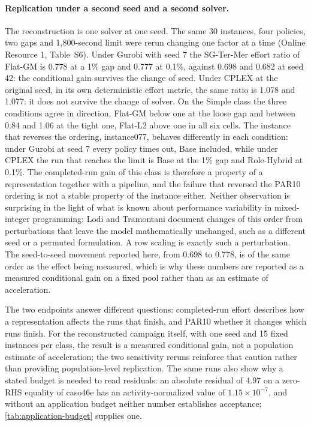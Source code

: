 \documentclass[smallextended,envcountsect,envcountsame]{svjour3}
\begin{document}
\paragraph{Replication under a second seed and a second solver.} The reconstruction is one
solver at one seed. The same 30 instances, four policies, two gaps and 1,800-second limit were
rerun changing one factor at a time (Online Resource 1, Table~S6). Under Gurobi with seed 7 the
SG-Ter-Mer effort ratio of Flat-GM is 0.778 at a 1\% gap and 0.777 at 0.1\%, against 0.698 and
0.682 at seed 42: the conditional gain survives the change of seed. Under CPLEX at the original
seed, in its own deterministic effort metric, the same ratio is 1.078 and 1.077: it does not survive
the change of solver. On the Simple class the three conditions agree in direction, Flat-GM below
one at the loose gap and between 0.84 and 1.06 at the tight one, Flat-L2 above one in all six
cells. The instance that reverses the ordering, instance077, behaves differently in each
condition: under Gurobi at seed 7 every policy times
out, Base included, while under CPLEX the run that reaches the limit is Base at the 1\% gap and
Role-Hybrid at 0.1\%.
The completed-run gain of this class is therefore a property of a representation together with a
pipeline, and the failure that reversed the PAR10 ordering is not a stable property of the
instance either. Neither observation is surprising in the light of what is known about
performance variability in mixed-integer programming: Lodi and Tramontani
\cite{lodi2013variability} document changes of this order from perturbations that leave the
model mathematically unchanged, such as a different seed or a permuted formulation. A row
scaling is exactly such a perturbation. The seed-to-seed movement reported here, from 0.698 to
0.778, is of the same order as the effect being measured, which is why these numbers are
reported as a measured conditional gain on a fixed pool rather than as an estimate of
acceleration.

The two endpoints answer different questions: completed-run effort describes how a
representation affects the runs that finish, and PAR10 whether it changes which runs finish.
For the reconstructed campaign itself, with one seed and 15 fixed instances per class, the
result is a measured conditional gain, not a population estimate of acceleration; the two
sensitivity reruns reinforce that caution rather than providing population-level replication. The same runs also show why a stated budget is
needed to read residuals: an absolute residual of 4.97 on a zero-RHS equality of caso46e has an
activity-normalized value of $1.15\times10^{-7}$, and without an application budget neither
number establishes acceptance; \cref{tab:application-budget} supplies one.
\end{document}
